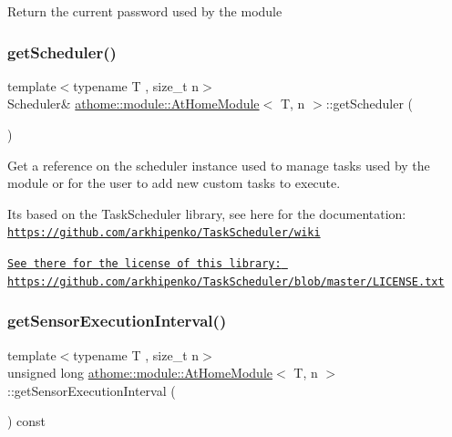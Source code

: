 Return the current password used by the module \mbox{\label{classathome_1_1module_1_1_at_home_module_a954f37f05e5738f270a35fef58782ba6}} 
\subsubsection{\texorpdfstring{get\+Scheduler()}{getScheduler()}}
{\footnotesize\ttfamily template$<$typename T , size\+\_\+t n$>$ \\
Scheduler\& \mbox{\hyperlink{classathome_1_1module_1_1_at_home_module}{athome\+::module\+::\+At\+Home\+Module}}$<$ T, n $>$\+::get\+Scheduler (\begin{DoxyParamCaption}{ }\end{DoxyParamCaption})\hspace{0.3cm}{\ttfamily [inline]}}

Get a reference on the scheduler instance used to manage tasks used by the module or for the user to add new custom tasks to execute.

It\textquotesingle{}s based on the Task\+Scheduler library, see here for the documentation\+: \href{https://github.com/arkhipenko/TaskScheduler/wiki}{\tt https\+://github.\+com/arkhipenko/\+Task\+Scheduler/wiki}

\href{https://github.com/arkhipenko/TaskScheduler/blob/master/LICENSE.txt}{\tt See there for the license of this library\+: https\+://github.\+com/arkhipenko/\+Task\+Scheduler/blob/master/\+L\+I\+C\+E\+N\+S\+E.\+txt} \mbox{\label{classathome_1_1module_1_1_at_home_module_ae0d4458da2bafd104386671d300fb562}} 
\subsubsection{\texorpdfstring{get\+Sensor\+Execution\+Interval()}{getSensorExecutionInterval()}}
{\footnotesize\ttfamily template$<$typename T , size\+\_\+t n$>$ \\
unsigned long \mbox{\hyperlink{classathome_1_1module_1_1_at_home_module}{athome\+::module\+::\+At\+Home\+Module}}$<$ T, n $>$\+::get\+Sensor\+Execution\+Interval (\begin{DoxyParamCaption}{ }\end{DoxyParamCaption}) const\hspace{0.3cm}{\ttfamily [inline]}}

